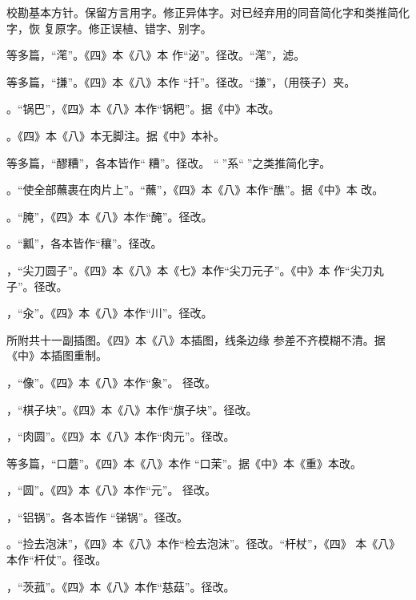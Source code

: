 校勘基本方针。保留方言用字。修正异体字。对已经弃用的同音简化字和类推简化字，恢
复原字。修正误植、错字、别字。

\null%

等多篇，“滗”。《四》本《八》本
作“泌”。径改。“滗”，滤。

等多篇，“搛”。《四》本《八》本作
“扦”。径改。“搛”，（用筷子）夹。

。“锅巴”，《四》本《八》本作“锅粑”。据《中》本改。

。《四》本《八》本无脚注{\footnotesize{}}。据《中》本补。

等多篇，“醪糟”，各本皆作“𰪿糟”。径改。
“𰪿”系“𫃑”之类推简化字。

。“使全部蘸裹在肉片上”。“蘸”，《四》本《八》本作“醮”。据《中》本
改。

。“腌”，《四》本《八》本作“醃”。径改。

。“瓤”，各本皆作“穰”。径改。

，“尖刀圆子”。《四》本《八》本《七》本作“尖刀元子”。《中》本
作“尖刀丸子”。径改。

，“汆”。《四》本《八》本作“川”。径改。

所附共十一副插图。《四》本《八》本插图，线条边缘
参差不齐模糊不清。据《中》本插图重制。

，“像”。\null《四》本《八》本作“象”。
径改。

，“棋子块”。《四》本《八》本作“旗子块”。径改。

，“肉圆”。《四》本《八》本作“肉元”。径改。

等多篇，“口蘑”。《四》本《八》本作
“口茉”。据《中》本《重》本改。

，“圆”。《四》本《八》本作“元”。
径改。

，“铝锅”。各本皆作
“锑锅”。径改。

。“捡去泡沫”，《四》本《八》本作“检去泡沫”。径改。“杆杖”，《四》
本《八》本作“杆仗”。径改。

，“茨菰”。《四》本《八》本作“慈菇”。径改。

